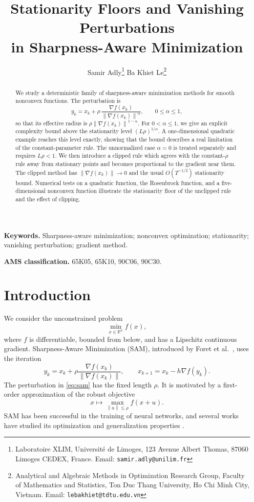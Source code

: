 \documentclass[11pt]{article}
\title{\bf Stationarity Floors and Vanishing Perturbations\\
in Sharpness-Aware Minimization}
\author{
Samir Adly\thanks{Laboratoire XLIM, Universit\'e de Limoges,
123 Avenue Albert Thomas, 87060 Limoges CEDEX, France.
Email: \texttt{samir.adly@unilim.fr}}
\qquad
Ba Khiet Le\thanks{Analytical and Algebraic Methods in Optimization
Research Group, Faculty of Mathematics and Statistics,
Ton Duc Thang University, Ho Chi Minh City, Vietnam.
Email: \texttt{lebakhiet@tdtu.edu.vn}}
}
\date{}
\theoremstyle{remark}
\newcommand{\R}{\mathbb{R}}
\newcommand{\norm}[1]{\left\lVert #1\right\rVert}
\begin{document}
\maketitle

\begin{abstract}
We study a deterministic family of sharpness-aware minimization methods for
smooth nonconvex functions.  The perturbation is
$$
  y_k=x_k+\rho\,
  \frac{\nabla f(x_k)}{\norm{\nabla f(x_k)}^\alpha},
  \qquad 0\leq\alpha\leq 1,
$$
so that its effective radius is
$\rho\norm{\nabla f(x_k)}^{1-\alpha}$.
For $0<\alpha\leq1$, we give an explicit complexity bound above the
stationarity level $(L\rho)^{1/\alpha}$.  A one-dimensional quadratic
example reaches this level exactly, showing that the bound describes a real
limitation of the constant-parameter rule.  The unnormalized case
$\alpha=0$ is treated separately and requires $L\rho<1$.  We then
introduce a clipped rule which agrees with the constant-$\rho$ rule away
from stationary points and becomes proportional to the gradient near them.
The clipped method has
$\norm{\nabla f(x_k)}\to0$ and the usual $O(T^{-1/2})$ stationarity
bound.  Numerical tests on a quadratic function, the Rosenbrock function,
and a five-dimensional nonconvex function illustrate the stationarity floor
of the unclipped rule and the effect of clipping.
\end{abstract}

\noindent\textbf{Keywords.}
Sharpness-aware minimization; nonconvex optimization; stationarity;
vanishing perturbation; gradient method.

\smallskip
\noindent\textbf{AMS classification.}
65K05, 65K10, 90C06, 90C30.
\tableofcontents
\section{Introduction}

We consider the unconstrained problem
\begin{equation}\label{eq:problem}
  \min_{x\in\R^n} f(x),
\end{equation}
where $f$ is differentiable, bounded from below, and has a Lipschitz
continuous gradient.  Sharpness-Aware Minimization (SAM), introduced by
Foret et al.~\cite{Foret2021}, uses the iteration
\begin{equation}\label{eq:sam}
  y_k=x_k+\rho\frac{\nabla f(x_k)}{\norm{\nabla f(x_k)}},
  \qquad
  x_{k+1}=x_k-h\nabla f(y_k).
\end{equation}
The perturbation in \eqref{eq:sam} has the fixed length $\rho$.  It is
motivated by a first-order approximation of the robust objective
$$
  x\longmapsto\max_{\norm{u}\leq\rho}f(x+u).
$$
SAM has been successful in the training of neural networks, and several
works have studied its optimization and generalization properties
\cite{Andriushchenko2022,Dai2023,Si2023,Khanh2024,Oikonomou2025}.
\end{document}
